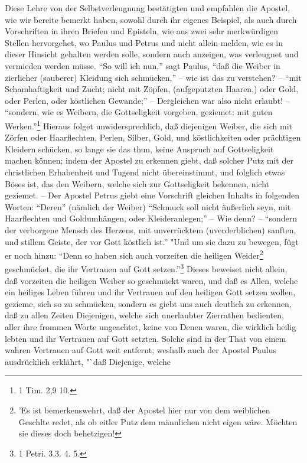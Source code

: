 Diese Lehre von der Selbstverleugnung bestätigten und empfahlen die Apostel, wie
wir bereite bemerkt haben, sowohl durch ihr eigenes Beispiel, als auch durch
Vorschriften in ihren Briefen und Episteln, wie aus zwei sehr merkwürdigen
Stellen hervorgehet, wo Paulus und Petrus und nicht allein melden, wie es in
dieser Hinsicht gehalten werden solle, sondern auch anzeigen, was verleugnet und
vermieden werden müsse. "`So will ich nun,"' sagt Paulus, "`daß die Weiber in
zierlicher (sauberer) Kleidung sich schmücken,"' -- wie ist das zu verstehen? --
"`mit Schamhaftigkeit und Zucht; nicht mit Zöpfen, (aufgeputzten Haaren,) oder
Gold, oder Perlen, oder köstlichen Gewande;"' -- Dergleichen war also nicht
erlaubt! -- "`sondern, wie es Weibern, die Gottseligkeit vorgeben, geziemet: mit
guten Werken."'\footnote{1 Tim. 2,9 10.} Hieraus folget unwidersprechlich, daß
diejenigen Weiber, die sich mit Zörfen oder Haarflechten, Perlen, Silber, Gold,
und köstlichkeiten oder prächtigen Kleidern schücken, so lange sie das thun,
keine Anspruch auf Gottseligkeit machen können; indem der Apostel zu erkennen
giebt, daß solcher Putz mit der christlichen Erhabenheit und Tugend nicht
übereinstimmt, und folglich etwas Böses ist, das den Weibern, welche sich zur
Gottseligkeit bekennen, nicht geziemet. -- Der Apostel Petrus giebt eine
Vorschrift gleichen Inhalts in folgenden Worten: "`Deren"' (nämlich der Weiber)
"`Schmuck soll nicht äußerlich seyn, mit Haarflechten und Goldumhängen, oder
Kleideranlegen;"' -- Wie denn? -- "`sondern der verborgene Mensch des Herzens,
mit unverrücktem (uverderblichen) sanften, und stillem Geiste, der vor Gott
köstlich ist."' "Und um sie dazu zu bewegen, fügt er noch hinzu: "`Denn so haben
sich auch vorzeiten die heiligen Weider\footnote{’Es ist bemerkenswehrt, daß der
Apostel hier nur von dem weiblichen Geschlte redet, als ob eitler Putz dem
männlichen nicht eigen wäre. Möchten sie dieses doch behetzigen!} geschmücket,
die ihr Vertrauen auf Gott setzen."'\footnote{1 Petri. 3,3. 4. 5.} Dieses
beweiset nicht allein, daß vorzeiten die heiligen Weiber so geschmückt waren,
und daß es Allen, welche ein heiliges Leben führen und ihr Vertrauen auf den
heiligen Gott setzen wollen, gezieme, sich so zu schmücken, sondern es giebt uns
auch deutlich zu erkennen, daß zu allen Zeiten Diejenigen, welche sich
unerlaubter Zierrathen bedienten, aller ihre frommen Worte ungeachtet, keine von
Denen waren, die wirklich heilig lebten und ihr Vertrauen auf Gott setzten.
Solche sind in der That von einem wahren Vertrauen auf Gott weit entfernt;
weshalb auch der Apostel Paulus ausdrücklich erklährt, "`daß Diejenige, welche

